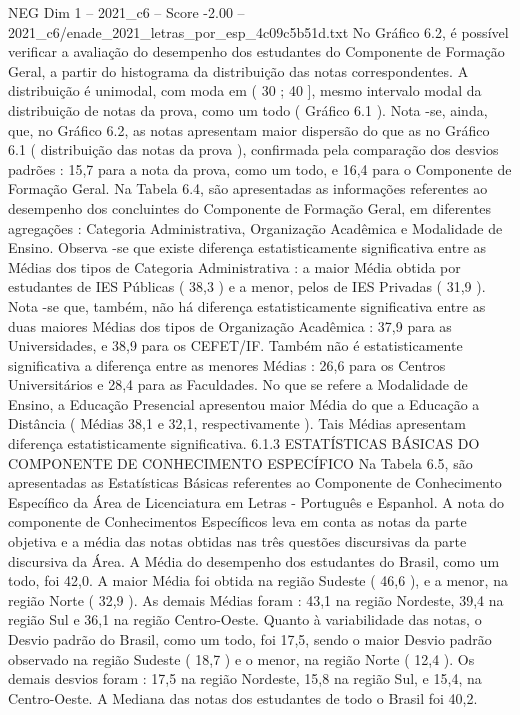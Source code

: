 \begin{textsample}{NEG Dim 1 – 2021\_c6 – Score -2.00 – 2021\_c6/enade\_2021\_letras\_por\_esp\_4c09c5b51d.txt}
No Gráfico 6.2, é possível verificar a avaliação do desempenho dos estudantes do Componente de Formação Geral, a partir do histograma da distribuição das notas correspondentes.
A distribuição é unimodal, com moda em ( 30 ; 40 ], mesmo intervalo modal da distribuição de notas da prova, como um todo ( Gráfico 6.1 ).
Nota -se, ainda, que, no Gráfico 6.2, as notas apresentam maior dispersão do que as no Gráfico 6.1 ( distribuição das notas da prova ), confirmada pela comparação dos desvios padrões : 15,7 para a nota da prova, como um todo, e 16,4 para o Componente de Formação Geral.
Na Tabela 6.4, são apresentadas as informações referentes ao desempenho dos concluintes do Componente de Formação Geral, em diferentes agregações : Categoria Administrativa, Organização Acadêmica e Modalidade de Ensino.
Observa -se que existe diferença estatisticamente significativa entre as Médias dos tipos de Categoria Administrativa : a maior Média obtida por estudantes de IES Públicas ( 38,3 ) e a menor, pelos de IES Privadas ( 31,9 ).
Nota -se que, também, não há diferença estatisticamente significativa entre as duas maiores Médias dos tipos de Organização Acadêmica : 37,9 para as Universidades, e 38,9 para os CEFET/IF.
Também não é estatisticamente significativa a diferença entre as menores Médias : 26,6 para os Centros Universitários e 28,4 para as Faculdades.
No que se refere a Modalidade de Ensino, a Educação Presencial apresentou maior Média do que a Educação a Distância ( Médias 38,1 e 32,1, respectivamente ).
Tais Médias apresentam diferença estatisticamente significativa. 6.1.3 ESTATÍSTICAS BÁSICAS DO COMPONENTE DE CONHECIMENTO ESPECÍFICO Na Tabela 6.5, são apresentadas as Estatísticas Básicas referentes ao Componente de Conhecimento Específico da Área de Licenciatura em Letras - Português e Espanhol.
A nota do componente de Conhecimentos Específicos leva em conta as notas da parte objetiva e a média das notas obtidas nas três questões discursivas da parte discursiva da Área.
A Média do desempenho dos estudantes do Brasil, como um todo, foi 42,0.
A maior Média foi obtida na região Sudeste ( 46,6 ), e a menor, na região Norte ( 32,9 ).
As demais Médias foram : 43,1 na região Nordeste, 39,4 na região Sul e 36,1 na região Centro-Oeste.
Quanto à variabilidade das notas, o Desvio padrão do Brasil, como um todo, foi 17,5, sendo o maior Desvio padrão observado na região Sudeste ( 18,7 ) e o menor, na região Norte ( 12,4 ).
Os demais desvios foram : 17,5 na região Nordeste, 15,8 na região Sul, e 15,4, na Centro-Oeste.
A Mediana das notas dos estudantes de todo o Brasil foi 40,2.

\end{textsample}
